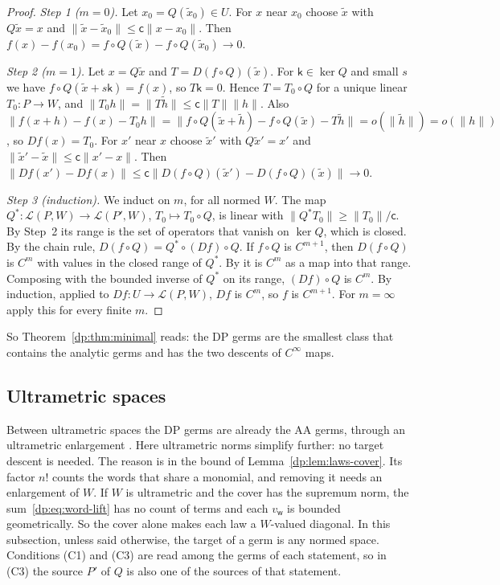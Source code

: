 \documentclass[11pt]{amsart}
\theoremstyle{definition}
\theoremstyle{remark}
\numberwithin{equation}{section}
\newcommand{\cL}{\mathcal L}
\newcommand{\norm}[1]{\lVert #1\rVert}
\theoremstyle{plain}
\theoremstyle{definition}
\theoremstyle{plain}
\begin{document}
\begin{proof}
\emph{Step 1 ($m=0$).} Let $x_0=Q(\tilde x_0)\in U$. For $x$ near $x_0$ choose $\tilde x$ with $Q\tilde x=x$ and $\norm{\tilde x-\tilde x_0}\le\mathsf c\norm{x-x_0}$. Then $f(x)-f(x_0)=f\circ Q(\tilde x)-f\circ Q(\tilde x_0)\to0$.

\emph{Step 2 ($m=1$).} Let $x=Q\tilde x$ and $T=D(f\circ Q)(\tilde x)$. For $\mathsf k\in\ker Q$ and small $s$ we have $f\circ Q(\tilde x+s\mathsf k)=f(x)$, so $T\mathsf k=0$. Hence $T=T_0\circ Q$ for a unique linear $T_0\colon P\to W$, and $\norm{T_0h}=\norm{T\tilde h}\le\mathsf c\norm T\norm h$. Also $\norm{f(x+h)-f(x)-T_0h}=\norm{f\circ Q(\tilde x+\tilde h)-f\circ Q(\tilde x)-T\tilde h}=o(\norm{\tilde h})=o(\norm h)$, so $Df(x)=T_0$. For $x'$ near $x$ choose $\tilde x'$ with $Q\tilde x'=x'$ and $\norm{\tilde x'-\tilde x}\le\mathsf c\norm{x'-x}$. Then $\norm{Df(x')-Df(x)}\le\mathsf c\norm{D(f\circ Q)(\tilde x')-D(f\circ Q)(\tilde x)}\to0$.

\emph{Step 3 (induction).} We induct on $m$, for all normed $W$. The map $Q^*\colon\cL(P,W)\to\cL(P',W)$, $T_0\mapsto T_0\circ Q$, is linear with $\norm{Q^*T_0}\ge\norm{T_0}/\mathsf c$. By Step~2 its range is the set of operators that vanish on $\ker Q$, which is closed. By the chain rule, $D(f\circ Q)=Q^*\circ(Df)\circ Q$. If $f\circ Q$ is $C^{m+1}$, then $D(f\circ Q)$ is $C^m$ with values in the closed range of $Q^*$. By \cite[Lemma~2.4]{I} it is $C^m$ as a map into that range. Composing with the bounded inverse of $Q^*$ on its range, $(Df)\circ Q$ is $C^m$. By induction, applied to $Df\colon U\to\cL(P,W)$, $Df$ is $C^m$, so $f$ is $C^{m+1}$. For $m=\infty$ apply this for every finite $m$.
\end{proof}

So Theorem~\ref{dp:thm:minimal} reads: the DP germs are the smallest class that contains the analytic germs and has the two descents of $C^\infty$ maps.

\subsection{Ultrametric spaces}\label{dp:ssec:um-minimal}

Between ultrametric spaces the DP germs are already the AA germs, through an ultrametric enlargement \cite[Theorem~14.39(1)]{I}. Here ultrametric norms simplify further: no target descent is needed. The reason is in the bound of Lemma~\ref{dp:lem:laws-cover}. Its factor $n!$ counts the words that share a monomial, and removing it needs an enlargement of $W$. If $W$ is ultrametric and the cover has the supremum norm, the sum~\eqref{dp:eq:word-lift} has no count of terms and each $v_{\mathsf w}$ is bounded geometrically. So the cover alone makes each law a $W$-valued diagonal. In this subsection, unless said otherwise, the target of a germ is any normed space. Conditions (C1) and (C3) are read among the germs of each statement, so in (C3) the source $P'$ of $Q$ is also one of the sources of that statement.
\end{document}
